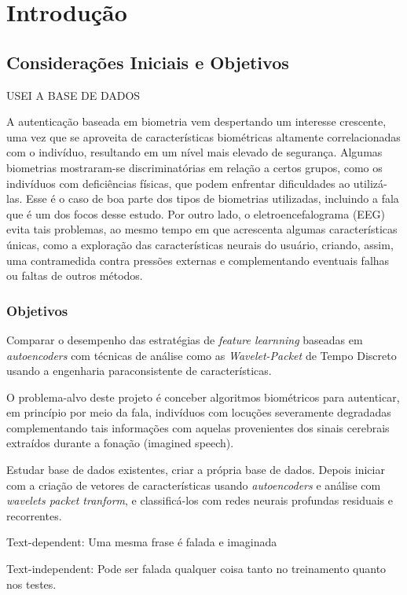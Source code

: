 \chapter{Introdução}
	\section{Considerações Iniciais e Objetivos}
	
		\par USEI A BASE DE DADOS \cite{10.1117/12.2255697}
	
		\par A autenticação baseada em biometria vem despertando um interesse crescente, uma vez que se aproveita de características biométricas altamente correlacionadas com o indivíduo, resultando em um nível mais elevado de segurança. Algumas biometrias mostraram-se discriminatórias em relação a certos grupos, como os indivíduos com deficiências físicas, que podem enfrentar dificuldades ao utilizá-las. Esse é o caso de boa parte dos tipos de biometrias utilizadas, incluindo a fala que é um dos focos desse estudo. Por outro lado, o eletroencefalograma (EEG) evita tais problemas, ao mesmo tempo em que acrescenta algumas características únicas, como a exploração das características neurais do usuário, criando, assim, uma contramedida contra pressões externas e complementando eventuais falhas ou faltas de outros métodos.
	
		\subsection{Objetivos}
			\par Comparar o desempenho das estratégias de \textit{feature learnning} baseadas em \textit{autoencoders} com técnicas de análise como as \textit{Wavelet-Packet} de Tempo Discreto usando a engenharia paraconsistente de características.
			\par O problema-alvo deste projeto é conceber algoritmos biométricos para autenticar, em princípio por meio da fala,  indivíduos com locuções severamente degradadas complementando tais informações com aquelas provenientes dos sinais cerebrais extraídos durante a fonação (imagined speech).
			\par Estudar base de dados existentes, criar a própria base de dados. Depois iniciar com a criação de vetores de características usando \textit{autoencoders} e análise com \textit{wavelets packet tranform}, e classificá-los com redes neurais profundas residuais e recorrentes.
			\par Text-dependent: Uma mesma frase é falada e imaginada
			\par Text-independent: Pode ser falada qualquer coisa tanto no treinamento quanto nos testes.
